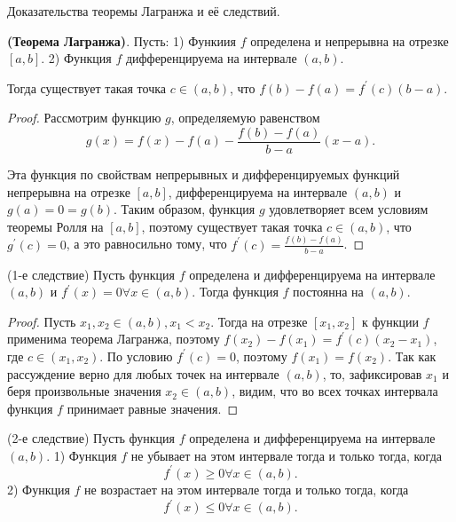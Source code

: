 \begin{problem}
Доказательства теоремы Лагранжа и её следствий.
\end{problem}
\begin{theorem} \textbf{(Теорема Лагранжа)}.
    Пусть:
    1) Функиия $f$ определена и непрерывна на отрезке $[a, b]$.
    2) Функция $f$ дифференцируема на интервале $(a, b)$.

    Тогда существует такая точка $c \in(a, b)$, что $f(b)-f(a)=f^{\prime}(c)(b-a)$.
\end{theorem}

\begin{proof}
    Рассмотрим функцию $g$, определяемую равенством
    $$
        g(x)=f(x)-f(a)-\frac{f(b)-f(a)}{b-a}(x-a) .
    $$

    Эта функция по свойствам непрерывных и дифференцируемых функций непрерывна на отрезке $[a, b]$, дифференцируема на интервале $(a, b)$ и $g(a)=0=g(b)$. Таким образом, функция $g$ удовлетворяет всем условиям теоремы Ролля на $[a, b]$, поэтому существует такая точка $c \in(a, b)$, что $g^{\prime}(c)=0$, а это равносильно тому, что $f^{\prime}(c)=\frac{f(b)-f(a)}{b-a}$.
\end{proof}


\begin{proposition}
    (1-е следствие) Пусть функция $f$ определена и дифференцируема на интервале $(a, b)$ и $f^{\prime}(x)=0 \forall x \in(a, b)$. Тогда функция $f$ постоянна на $(a, b)$.
\end{proposition}

\begin{proof}
    Пусть $x_1, x_2 \in(a, b), x_1<x_2$. Тогда на отрезке $\left[x_1, x_2\right]$ к функции $f$ применима теорема Лагранжа, поэтому $f\left(x_2\right)-f\left(x_1\right)=f^{\prime}(c)\left(x_2-x_1\right)$, где $c \in\left(x_1, x_2\right)$. По условию $f^{\prime}(c)=0$, поэтому $f\left(x_1\right)=f\left(x_2\right)$. Так как рассуждение верно для любых точек на интервале $(a, b)$, то, зафиксировав $x_1$ и беря произвольные значения $x_2 \in(a, b)$, видим, что во всех точках интервала функция $f$ принимает равные значения.
\end{proof}

\begin{proposition}
    (2-е следствие) Пусть функция $f$ определена и дифференцируема на интервале $(a, b)$.
    1) Функция $f$ не убывает на этом интервале тогда и только тогда, когда
    $$
        f^{\prime}(x) \geq 0 \forall x \in(a, b) .
    $$
    2) Функция $f$ не возрастает на этом интервале тогда и только тогда, когда
    $$
        f^{\prime}(x) \leq 0 \forall x \in(a, b) .
    $$
\end{proposition}

